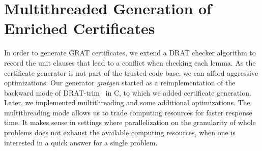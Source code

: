 \documentclass[smallcondensed]{svjour3}     %
\newcommand\CC{C\nolinebreak[4]\hspace{-.05em}\raisebox{.4ex}{\relsize{-3}{\textbf{++}}}}
\begin{document}
%     
%   
%   
%       
%       
%     
%     
    
\section{Multithreaded Generation of Enriched Certificates}\label{sec:gratgen}
In order to generate GRAT certificates, we extend a DRAT checker algorithm 
to record the unit clauses that lead to a conflict when checking each lemma. 
As the certificate generator is not part of the trusted code base, we can afford aggressive optimizations.
Our generator \emph{gratgen} started as a reimplementation of the backward mode of DRAT-trim~\cite{WHH13,drat-trim-webpage} in \CC, to 
which we added certificate generation. Later, we implemented multithreading and some additional optimizations.
The multithreading mode allows us to trade computing resources for faster response time. It makes sense in settings where parallelization 
on the granularity of whole problems does not exhaust the available computing resources, \eg when one is interested in a quick answer for a single problem.
\end{document}

